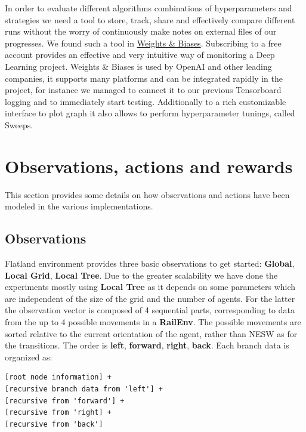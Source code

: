 \documentclass[11pt, a4paper, hidelinks]{report}
\begin{document}
In order to evaluate different algorithms combinations of hyperparameters and strategies we need a tool to store, track, share and effectively compare different runs without the worry of continuously make notes on external files of our progresses.
We found such a tool in \href{https://www.wandb.com/}{Weights \& Biases}.
Subscribing to a free account provides an effective and very intuitive way of monitoring a Deep Learning project.
Weights \& Biases is used by OpenAI and other leading companies, it supports many platforms and can be integrated rapidly in the project, for instance we managed to connect it to our previous Tensorboard logging and to immediately start testing.
Additionally to a rich customizable interface to plot graph it also allows to perform hyperparameter tunings, called Sweeps.

\section{Observations, actions and rewards}\label{sec:observations,-actions-and-rewards}

This section provides some details on how observations and actions have been modeled in the various implementations.

\subsection{Observations}\label{subsec:observations}

Flatland environment provides three basic observations to get started: \textbf{Global}, \textbf{Local Grid}, \textbf{Local Tree}.
Due to the greater scalability we have done the experiments mostly using \textbf{Local Tree} as it depends on some parameters which are independent of the size of the grid and the number of agents.
For the latter the observation vector is composed of 4 sequential parts, corresponding to data from the up to 4 possible movements in a \textbf{RailEnv}.
The possible movements are sorted relative to the current orientation of the agent, rather than NESW as for the transitions.
The order is \textbf{left}, \textbf{forward}, \textbf{right}, \textbf{back}.
Each branch data is organized as:

\begin{lstlisting}[label={lst:tree-obs}]
[root node information] +
[recursive branch data from 'left'] +
[recursive from 'forward'] +
[recursive from 'right] +
[recursive from 'back']
\end{lstlisting}
\end{document}
